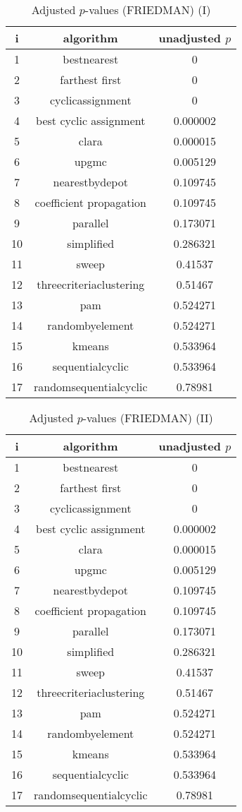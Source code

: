 \documentclass[a4paper,10pt]{article}
\begin{document}
\begin{landscape}
\begin{table}[!htp]
\centering\small
\begin{tabular}{ccc}
i&algorithm&unadjusted $p$\\
\hline1&bestnearest&0\\2&farthest first&0\\3&cyclicassignment&0\\4&best cyclic assignment&0.000002\\5&clara&0.000015\\6&upgmc&0.005129\\7&nearestbydepot&0.109745\\8&coefficient propagation&0.109745\\9&parallel&0.173071\\10&simplified&0.286321\\11&sweep&0.41537\\12&threecriteriaclustering&0.51467\\13&pam&0.524271\\14&randombyelement&0.524271\\15&kmeans&0.533964\\16&sequentialcyclic&0.533964\\17&randomsequentialcyclic&0.78981\\\hline
\end{tabular}
\caption{Adjusted $p$-values (FRIEDMAN) (I)}
\end{table}
\begin{table}[!htp]
\centering\small
\begin{tabular}{ccc}
i&algorithm&unadjusted $p$\\
\hline1&bestnearest&0\\2&farthest first&0\\3&cyclicassignment&0\\4&best cyclic assignment&0.000002\\5&clara&0.000015\\6&upgmc&0.005129\\7&nearestbydepot&0.109745\\8&coefficient propagation&0.109745\\9&parallel&0.173071\\10&simplified&0.286321\\11&sweep&0.41537\\12&threecriteriaclustering&0.51467\\13&pam&0.524271\\14&randombyelement&0.524271\\15&kmeans&0.533964\\16&sequentialcyclic&0.533964\\17&randomsequentialcyclic&0.78981\\\hline
\end{tabular}
\caption{Adjusted $p$-values (FRIEDMAN) (II)}
\end{table}

\newpage
\end{landscape}
\end{document}
